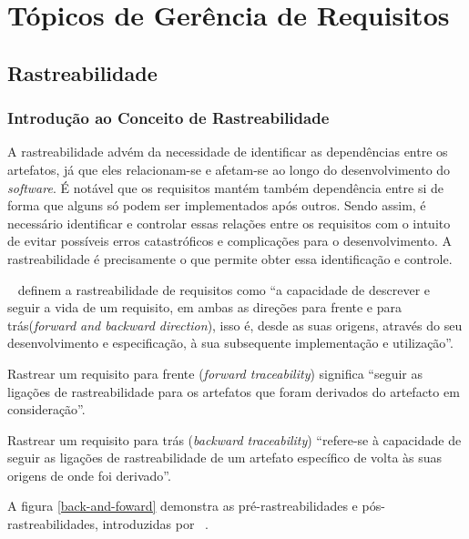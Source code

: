 \chapter{Tópicos de Gerência de Requisitos}
\label{management}

\section{Rastreabilidade}

\subsection{Introdução ao Conceito de Rastreabilidade}

A rastreabilidade advém da necessidade de identificar as dependências entre os artefatos, já que eles relacionam-se e afetam-se ao longo do desenvolvimento do \textit{software}. É notável que os requisitos mantém também dependência entre si de forma que alguns só podem ser implementados após outros. Sendo assim, é necessário identificar e controlar essas relações entre os requisitos com o intuito de evitar possíveis erros catastróficos e complicações para o desenvolvimento. A rastreabilidade é precisamente o que permite obter essa identificação e controle.

~\cite{gotel} definem a rastreabilidade de requisitos como “a capacidade de descrever e seguir a vida de um requisito, em ambas as direções para frente e para trás(\textit{forward and backward direction}), isso é, desde as suas origens, através do seu desenvolvimento e especificação, à sua subsequente implementação e utilização”.

Rastrear um requisito para frente (\textit{forward traceability}) significa “seguir as ligações de rastreabilidade para os artefatos que foram derivados do artefacto em consideração”.~\cite{winkler}

Rastrear um requisito para trás (\textit{backward traceability}) “refere-se à capacidade de seguir as ligações de rastreabilidade de um artefato específico de volta às suas origens de onde foi derivado”.~\cite{winkler}

A figura \ref{back-and-foward} demonstra as pré-rastreabilidades e pós-rastreabilidades, introduzidas por ~\cite{gotel}.

